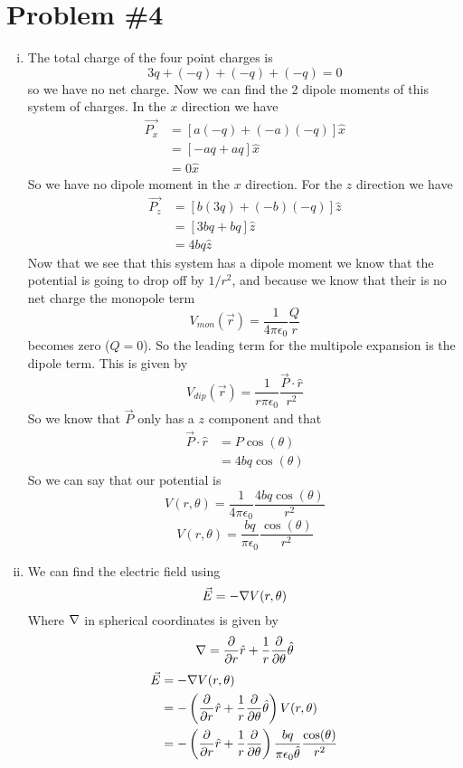 \documentclass[11pt]{article}
\numberwithin{equation}{section}
\newcommand{\grad}{\bold\nabla}
\newcommand{\vecE}{\vec{E}}
\begin{document}
\section{Problem \#4}
\begin{enumerate}[(i)]
\item
The total charge of the four point charges is 
$$3q+(-q)+(-q)+(-q)=0$$
so we have no net charge. Now we can find the 2 dipole moments of this system of charges. In the $x$ direction we have
\begin{align*}
\vec{P_x} &= [a(-q)+(-a)(-q)]\hat{x}\\
&= [-aq+aq]\hat{x}\\
&= 0\hat{x}
\end{align*}
So we have no dipole moment in the $x$ direction. For the $z$ direction we have
\begin{align*}
\vec{P_z} &= [b(3q)+(-b)(-q)]\hat{z}\\
&= [3bq+bq]\hat{z}\\
&= 4bq\hat{z}
\end{align*}
Now that we see that this system has a dipole moment we know that the potential is going to drop off by $1/r^2$, and because we know that their is no net charge the monopole term
$$V_{mon}(\vec{r}) = \frac{1}{4\pi\epsilon_0}\frac{Q}{r}$$
becomes zero ($Q=0$). So the leading term for the multipole expansion is the dipole term. This is given by
$$V_{dip}(\vec{r}) = \frac{1}{r\pi\epsilon_0}\frac{\vec{P}\cdot\hat{r}}{r^2}$$
So we know that $\vec{P}$ only has a $z$ component and that
\begin{align*}
\vec{P}\cdot\hat{r} &= P\cos(\theta)\\
 &= 4bq\cos(\theta)
\end{align*}
So we can say that our potential is 
$$V(r,\theta) = \frac{1}{4\pi\epsilon_0}\frac{4bq\cos(\theta)}{r^2}$$
$$V(r,\theta) = \frac{bq}{\pi\epsilon_0}\frac{\cos(\theta)}{r^2}$$
\item
We can find the electric field using
$$\vecE = -\grad V(r,\theta)$$
Where $\grad$ in spherical coordinates is given by
$$\grad = \frac{\partial}{\partial r}\hat{r}+\frac{1}{r}\frac{\partial}{\partial \theta}\hat{\theta}$$
\begin{align*}
\vecE &= -\grad V(r,\theta)\\
&=  -\left(\frac{\partial}{\partial r}\hat{r}+\frac{1}{r}\frac{\partial}{\partial \theta}\hat{\theta}\right) V(r,\theta)\\
&=  -\left(\frac{\partial}{\partial r}\hat{r}+\frac{1}{r}\frac{\partial}{\partial \theta}\right)\frac{bq}{\pi\epsilon_0\hat{\theta}}\frac{\cos(\theta)}{r^2}\\

\end{align*}
\end{enumerate}
\end{document}
